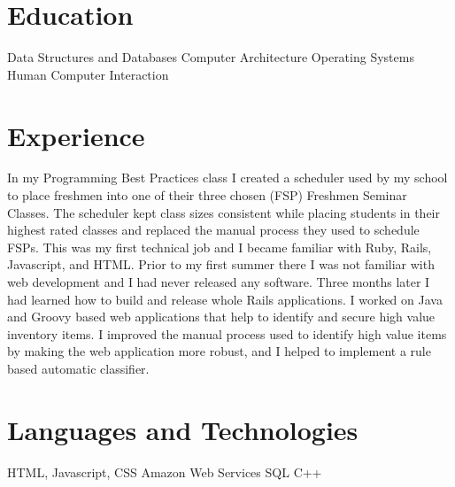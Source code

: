 \documentclass[11pt,a4paper,sans]{moderncv}
\begin{document}
\makecvtitle
\section{Education}
 {Data Structures and Databases}
 {Computer Architecture}
 {Operating Systems}
 {Human Computer Interaction}

\section{Experience}
{In my Programming Best Practices class I created a scheduler used by my
  school to place freshmen into one of their three chosen (FSP) Freshmen Seminar
  Classes.
  The scheduler kept class sizes consistent while placing students in their
  highest rated classes and replaced the manual process they used to schedule
  FSPs.}
{This was my first technical job and I became familiar with
  Ruby, Rails, Javascript, and HTML. Prior to my first summer
  there I was not familiar with web development and I had never
  released any software. Three months later I had learned how to
  build and release whole Rails applications.}
{I worked on Java and Groovy based web applications that help to identify and secure high value inventory items.
  I improved the manual process used to identify high value items by making the web application more robust,
  and I helped to implement a rule based automatic classifier.}

\section{Languages and Technologies}
 {HTML, Javascript, CSS}
 {Amazon Web Services}
 {SQL}
 {C++}
\end{document}
